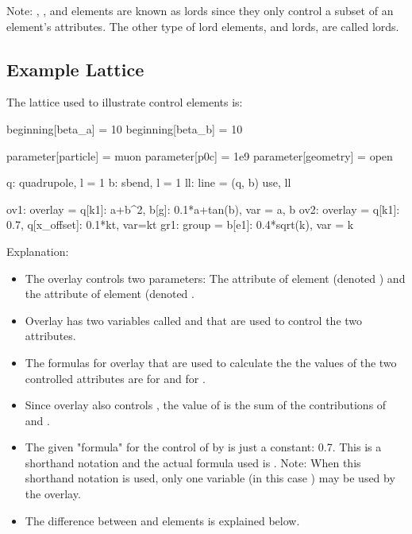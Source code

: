 \documentclass{hitec}
\begin{document}
Note: , , and  elements are known as  lords since they
only control a subset of an element's attributes. The other type of lord elements, 
and  lords, are called  lords.

\subsection{Example Lattice}


The lattice used to illustrate control elements is:
\begin{code}
beginning[beta_a] = 10
beginning[beta_b] = 10

parameter[particle] = muon
parameter[p0c] = 1e9
parameter[geometry] = open

q: quadrupole, l = 1
b: sbend, l = 1
ll: line = (q, b)
use, ll

ov1: overlay = {q[k1]: a+b^2, b[g]: 0.1*a+tan(b)}, var = {a, b}
ov2: overlay = {q[k1]: 0.7, q[x_offset]: 0.1*kt}, var={kt}
gr1: group = {b[e1]: 0.4*sqrt(k)}, var = {k}
\end{code}

Explanation:
\begin{itemize}
\item
The overlay  controls two parameters: 
The  attribute of element  (denoted ) and the  attribute of element
 (denoted .
\item
Overlay  has two variables called  and  that are used to control the two attributes.
\item
The formulas for overlay  that are used to calculate the the values of the two controlled
attributes are  for  and  for .
\item 
Since overlay  also controls , the value of  is the sum of the
contributions of  and .
\item
The given "formula" for the control of  by  is just a constant: 0.7. 
This is a shorthand notation and the actual formula used is . 
Note: When this shorthand notation is used, only one variable (in this case ) may be used by the overlay.
\item
The difference between  and  elements is explained below.
\end{itemize}
\end{document}
